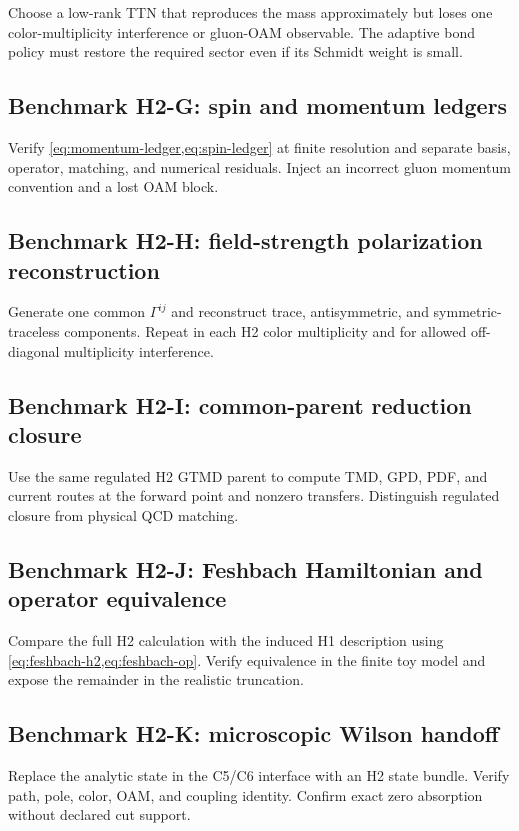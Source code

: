 \documentclass[11pt]{article}
\begin{document}
Choose a low-rank TTN that reproduces the mass approximately but loses one
color-multiplicity interference or gluon-OAM observable.  The adaptive bond
policy must restore the required sector even if its Schmidt weight is small.

\subsection{Benchmark H2-G: spin and momentum ledgers}

Verify \cref{eq:momentum-ledger,eq:spin-ledger} at finite resolution and
separate basis, operator, matching, and numerical residuals.  Inject an
incorrect gluon momentum convention and a lost OAM block.

\subsection{Benchmark H2-H: field-strength polarization reconstruction}

Generate one common \(\Gamma^{ij}\) and reconstruct trace, antisymmetric, and
symmetric-traceless components.  Repeat in each H2 color multiplicity and for
allowed off-diagonal multiplicity interference.

\subsection{Benchmark H2-I: common-parent reduction closure}

Use the same regulated H2 GTMD parent to compute TMD, GPD, PDF, and current
routes at the forward point and nonzero transfers.  Distinguish regulated
closure from physical QCD matching.

\subsection{Benchmark H2-J: Feshbach Hamiltonian and operator equivalence}

Compare the full H2 calculation with the induced H1 description using
\cref{eq:feshbach-h2,eq:feshbach-op}.  Verify equivalence in the finite toy model
and expose the remainder in the realistic truncation.

\subsection{Benchmark H2-K: microscopic Wilson handoff}

Replace the analytic state in the C5/C6 interface with an H2 state bundle.
Verify path, pole, color, OAM, and coupling identity.  Confirm exact zero
absorption without declared cut support.
\end{document}
